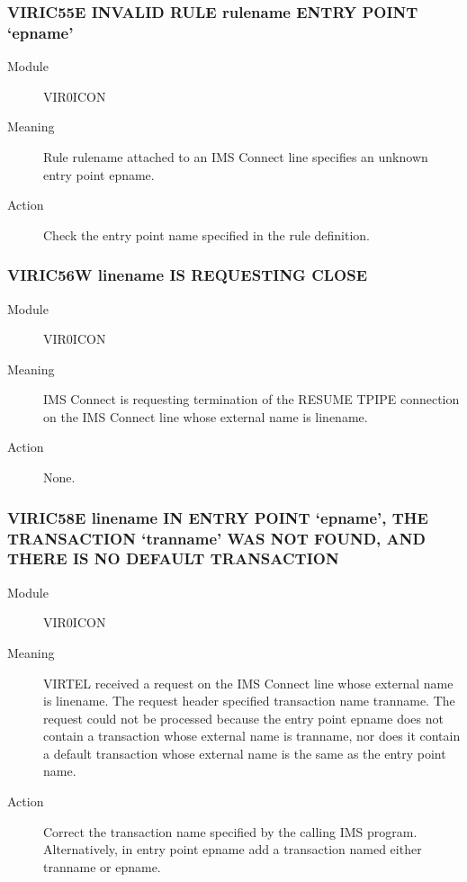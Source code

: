 \documentclass[letterpaper,10pt,english]{sphinxmanual}
\begin{document}
\subsubsection{VIRIC55E INVALID RULE rulename ENTRY POINT ‘epname’}
\label{\detokenize{messages:viric55e-invalid-rule-rulename-entry-point-epname}}\begin{description}
\item[{Module}] \leavevmode
VIR0ICON

\item[{Meaning}] \leavevmode
Rule rulename attached to an IMS Connect line specifies an unknown entry point epname.

\item[{Action}] \leavevmode
Check the entry point name specified in the rule definition.

\end{description}


\subsubsection{VIRIC56W linename IS REQUESTING CLOSE}
\label{\detokenize{messages:viric56w-linename-is-requesting-close}}\begin{description}
\item[{Module}] \leavevmode
VIR0ICON

\item[{Meaning}] \leavevmode
IMS Connect is requesting termination of the RESUME TPIPE connection on the IMS Connect line whose external name is linename.

\item[{Action}] \leavevmode
None.

\end{description}


\subsubsection{VIRIC58E linename IN ENTRY POINT ‘epname’, THE TRANSACTION ‘tranname’ WAS NOT FOUND, AND THERE IS NO DEFAULT TRANSACTION}
\label{\detokenize{messages:viric58e-linename-in-entry-point-epname-the-transaction-tranname-was-not-found-and-there-is-no-default-transaction}}\begin{description}
\item[{Module}] \leavevmode
VIR0ICON

\item[{Meaning}] \leavevmode
VIRTEL received a request on the IMS Connect line whose external name is linename. The request header specified transaction name tranname. The request could not be processed because the entry point epname does not contain a transaction whose external name is tranname, nor does it contain a default transaction whose external name is the same as the entry point name.

\item[{Action}] \leavevmode
Correct the transaction name specified by the calling IMS program. Alternatively, in entry point epname add a transaction named either tranname or epname.

\end{description}
\end{document}
